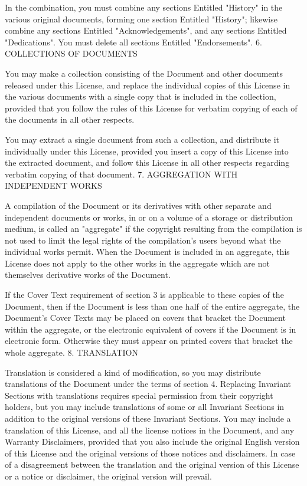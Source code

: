 {\begin{multicols}{4}
In the combination, you must combine any sections Entitled "History" in the various original documents, forming one section Entitled "History"; likewise combine any sections Entitled "Acknowledgements", and any sections Entitled "Dedications". You must delete all sections Entitled "Endorsements".
6. COLLECTIONS OF DOCUMENTS

You may make a collection consisting of the Document and other documents released under this License, and replace the individual copies of this License in the various documents with a single copy that is included in the collection, provided that you follow the rules of this License for verbatim copying of each of the documents in all other respects.

You may extract a single document from such a collection, and distribute it individually under this License, provided you insert a copy of this License into the extracted document, and follow this License in all other respects regarding verbatim copying of that document.
7. AGGREGATION WITH INDEPENDENT WORKS

A compilation of the Document or its derivatives with other separate and independent documents or works, in or on a volume of a storage or distribution medium, is called an "aggregate" if the copyright resulting from the compilation is not used to limit the legal rights of the compilation's users beyond what the individual works permit. When the Document is included in an aggregate, this License does not apply to the other works in the aggregate which are not themselves derivative works of the Document.

If the Cover Text requirement of section 3 is applicable to these copies of the Document, then if the Document is less than one half of the entire aggregate, the Document's Cover Texts may be placed on covers that bracket the Document within the aggregate, or the electronic equivalent of covers if the Document is in electronic form. Otherwise they must appear on printed covers that bracket the whole aggregate.
8. TRANSLATION

Translation is considered a kind of modification, so you may distribute translations of the Document under the terms of section 4. Replacing Invariant Sections with translations requires special permission from their copyright holders, but you may include translations of some or all Invariant Sections in addition to the original versions of these Invariant Sections. You may include a translation of this License, and all the license notices in the Document, and any Warranty Disclaimers, provided that you also include the original English version of this License and the original versions of those notices and disclaimers. In case of a disagreement between the translation and the original version of this License or a notice or disclaimer, the original version will prevail.


\end{multicols}}
